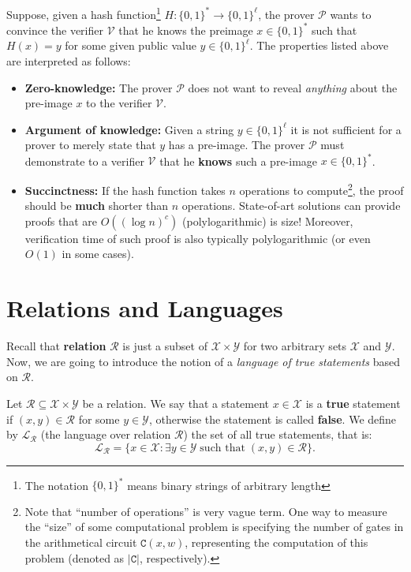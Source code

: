 \documentclass[../lecture-notes.tex]{subfiles}
\begin{document}
\begin{example}
    Suppose, given a hash function\footnote{The notation $\{0,1\}^*$ means binary strings of arbitrary length} $H: \{0,1\}^* \to \{0,1\}^{\ell}$, the prover $\mathcal{P}$ wants to convince the verifier $\mathcal{V}$ that he knows the preimage $x \in \{0,1\}^*$ such that $H(x) = y$ for some given public value $y \in \{0,1\}^{\ell}$. The properties listed above are interpreted as follows:
    \begin{itemize}
        \item \textbf{Zero-knowledge:} The prover $\mathcal{P}$ does not want to reveal \textit{anything} about the pre-image $x$ to the verifier $\mathcal{V}$.
        \item \textbf{Argument of knowledge:} Given a string $y \in \{0,1\}^{\ell}$ it is not sufficient for a prover to merely state that $y$ has a pre-image. The prover $\mathcal{P}$ must demonstrate to a verifier $\mathcal{V}$ that he \textbf{knows} such a pre-image $x \in \{0,1\}^*$.
        \item \textbf{Succinctness:} If the hash function takes $n$ operations to compute\footnote{Note that ``number of operations'' is very vague term. One way to measure the ``size'' of some computational problem is specifying the number of gates in the arithmetical circuit $\mathtt{C}(x,w)$, representing the computation of this problem (denoted as $|\mathtt{C}|$, respectively).}, the proof should be \textbf{much} shorter than $n$ operations. State-of-art solutions can provide proofs that are $O((\log n)^c)$ (polylogarithmic) is size! Moreover, verification time of such proof is also typically polylogarithmic (or even $O(1)$ in some cases).
    \end{itemize}
\end{example}

\section{Relations and Languages}\label{section:relations_and_languages}
Recall that \textbf{relation} $\mathcal{R}$ is just a subset of $\mathcal{X} \times \mathcal{Y}$ for two arbitrary sets $\mathcal{X}$ and $\mathcal{Y}$. Now, we are going to introduce the notion of a \emph{language of true statements} based on $\mathcal{R}$.

\begin{definition}
    Let $\mathcal{R} \subseteq \mathcal{X} \times \mathcal{Y}$ be a relation. We say that a statement $x \in \mathcal{X}$ is a \textbf{true} statement if $(x,y) \in \mathcal{R}$ for some $y \in \mathcal{Y}$, otherwise the statement is called \textbf{false}. We define by $\mathcal{L}_{\mathcal{R}}$ (the language over relation $\mathcal{R}$) the set of all true statements, that is:
    \begin{equation*}
        \mathcal{L}_{\mathcal{R}} = \{ x \in \mathcal{X}: \exists y \in \mathcal{Y} \; \text{such that} \; (x,y) \in \mathcal{R} \}.
    \end{equation*}
\end{definition}
\end{document}
